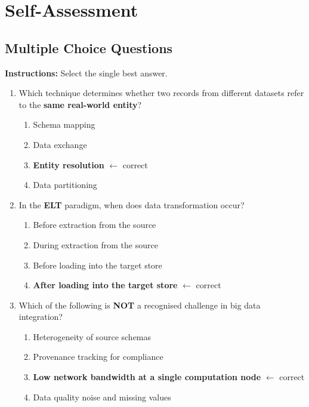 \documentclass[12pt,a4paper]{article}
\begin{document}
\section{Self-Assessment}

\subsection*{Multiple Choice Questions}

\noindent\textbf{Instructions:} Select the single best answer.

\begin{enumerate}[label=\textbf{Q\arabic*.}, leftmargin=2.5em, itemsep=10pt]

  \item Which technique determines whether two records from different datasets refer to the \textbf{same real-world entity}?
  \begin{enumerate}[label=(\alph*), leftmargin=2em, nosep, after=\vspace{4pt}]
    \item Schema mapping
    \item Data exchange
    \item \textbf{Entity resolution} \textcolor{PUGreen}{\small $\leftarrow$ correct}
    \item Data partitioning
  \end{enumerate}

  \item In the \textbf{ELT} paradigm, when does data transformation occur?
  \begin{enumerate}[label=(\alph*), leftmargin=2em, nosep, after=\vspace{4pt}]
    \item Before extraction from the source
    \item During extraction from the source
    \item Before loading into the target store
    \item \textbf{After loading into the target store} \textcolor{PUGreen}{\small $\leftarrow$ correct}
  \end{enumerate}

  \item Which of the following is \textbf{NOT} a recognised challenge in big data integration?
  \begin{enumerate}[label=(\alph*), leftmargin=2em, nosep, after=\vspace{4pt}]
    \item Heterogeneity of source schemas
    \item Provenance tracking for compliance
    \item \textbf{Low network bandwidth at a single computation node} \textcolor{PUGreen}{\small $\leftarrow$ correct}
    \item Data quality noise and missing values
  \end{enumerate}

\end{enumerate}
\end{document}
